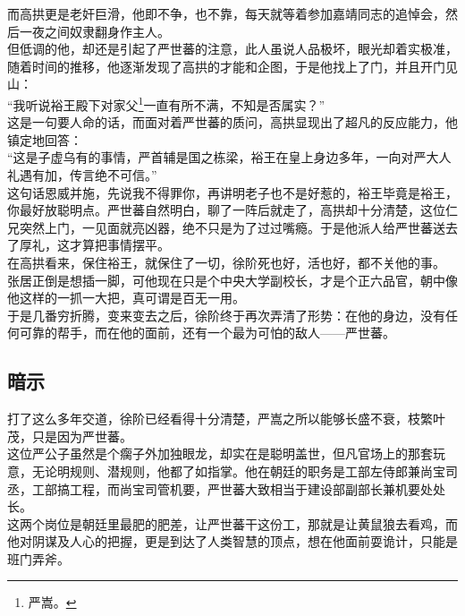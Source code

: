 \begin{multicols}{\theparacolNo}
而高拱更是老奸巨滑，他即不争，也不靠，每天就等着参加嘉靖同志的追悼会，然后一夜之间奴隶翻身作主人。\\

但低调的他，却还是引起了严世蕃的注意，此人虽说人品极坏，眼光却着实极准，随着时间的推移，他逐渐发现了高拱的才能和企图，于是他找上了门，并且开门见山：\\

“我听说裕王殿下对家父\footnote{严嵩。}一直有所不满，不知是否属实？”\\

这是一句要人命的话，而面对着严世蕃的质问，高拱显现出了超凡的反应能力，他镇定地回答：\\

“这是子虚乌有的事情，严首辅是国之栋梁，裕王在皇上身边多年，一向对严大人礼遇有加，传言绝不可信。”\\

这句话恩威并施，先说我不得罪你，再讲明老子也不是好惹的，裕王毕竟是裕王，你最好放聪明点。严世蕃自然明白，聊了一阵后就走了，高拱却十分清楚，这位仁兄突然上门，一见面就亮凶器，绝不只是为了过过嘴瘾。于是他派人给严世蕃送去了厚礼，这才算把事情摆平。\\

在高拱看来，保住裕王，就保住了一切，徐阶死也好，活也好，都不关他的事。\\

张居正倒是想插一脚，可他现在只是个中央大学副校长，才是个正六品官，朝中像他这样的一抓一大把，真可谓是百无一用。\\

于是几番穷折腾，变来变去之后，徐阶终于再次弄清了形势：在他的身边，没有任何可靠的帮手，而在他的面前，还有一个最为可怕的敌人——严世蕃。\\

\subsection{暗示}
打了这么多年交道，徐阶已经看得十分清楚，严嵩之所以能够长盛不衰，枝繁叶茂，只是因为严世蕃。\\

这位严公子虽然是个瘸子外加独眼龙，却实在是聪明盖世，但凡官场上的那套玩意，无论明规则、潜规则，他都了如指掌。他在朝廷的职务是工部左侍郎兼尚宝司丞，工部搞工程，而尚宝司管机要，严世蕃大致相当于建设部副部长兼机要处处长。\\

这两个岗位是朝廷里最肥的肥差，让严世蕃干这份工，那就是让黄鼠狼去看鸡，而他对阴谋及人心的把握，更是到达了人类智慧的顶点，想在他面前耍诡计，只能是班门弄斧。\\


\end{multicols}
